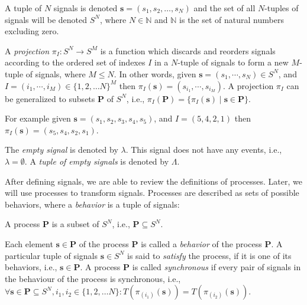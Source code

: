 A tuple of $N$ signals is denoted $\mathbf{s} = (s_1, s_2, \dots, s_N)$ and the
set of all $N$-tuples of signals will be denoted $S^N$, where $N \in \mathbb{N}$ and
$\mathbb{N}$ is the set of natural numbers excluding zero.
\begin{sdefinition}
A \emph{projection} $\pi{}_I: S^N \to S^M$ is a function which discards and reorders signals according
to the ordered set of indexes $I$ in a $N$-tuple of signals
to form a new $M$-tuple of signals, where $M \le N$. In other words, given $\mathbf{s} = (s_1,\cdots,s_N) \in S^N$,
and $I = (i_1,\cdots,i_M) \in \{1,2, \ldots N\}^M$
then $\pi{}_I(\mathbf{s}) = (s_{i_1}, \cdots, s_{i_M})$.
A projection $\pi{}_I$ can be generalized to subsets $\mathbf{P}$ of $S^N$,
i.e., $\pi{}_I(\mathbf{P}) = \{\pi{}_I(\mathbf{s}) \mid \mathbf{s} \in \mathbf{P}\}$.
\end{sdefinition}

For example given $\mathbf{s} = (s_1,s_2,s_3,s_4,s_5)$, and $I=(5,4,2,1)$ then
$\pi{}_I(\mathbf{s}) = (s_5,s_4,s_2,s_1)$.

The \emph{empty signal} is denoted by $\lambda$. This
signal does not have any events, i.e., $\lambda = \emptyset$. A \emph{tuple
of empty signals} is denoted by $\Lambda$.

After defining signals, we are able to review the definitions of processes.
Later, we will use processes to transform signals.
Processes are described as sets of possible behaviors, where
a \emph{behavior} is a tuple of signals:
\begin{sdefinition}
A process $\mathbf{P}$ is a subset of $S^N$, i.e., $\mathbf{P} \subseteq S^N$.
\end{sdefinition}
Each element $\mathbf{s} \in \mathbf{P}$ of the process $\mathbf{P}$ is
called a \emph{behavior} of the process $\mathbf{P}$. A particular tuple
of signals $\mathbf{s} \in S^N$ is said to \emph{satisfy} the process,
if it is one of its behaviors, i.e., $\mathbf{s} \in \mathbf{P}$.
A process $\mathbf{P}$ is called \emph{synchronous} if
every pair of signals in the behaviour of the process is synchronous, i.e.,
$\forall{\mathbf{s} \in \mathbf{P} \subseteq S^N, i_1, i_2 \in \{1,2,\ldots N\}}:
T(\pi{}_{(i_1)}(\mathbf{s})) = T(\pi{}_{(i_2)}(\mathbf{s}))$.

